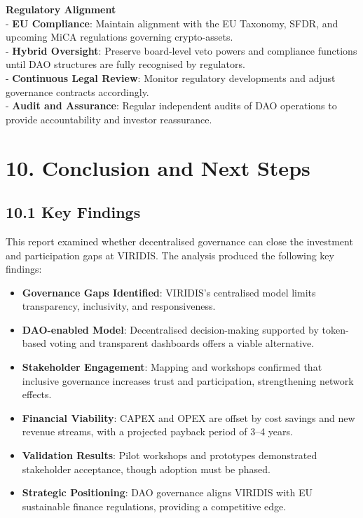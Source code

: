 \documentclass[
  english,
  12pt,
  oneside,
  open=any]{scrbook}
\providecommand{\tightlist}{%
  \setlength{\itemsep}{0pt}\setlength{\parskip}{0pt}}\usepackage{longtable,booktabs,array}
\begin{document}
\textbf{Regulatory Alignment}\\
- \textbf{EU Compliance}: Maintain alignment with the EU Taxonomy, SFDR,
and upcoming MiCA regulations governing crypto-assets.\\
- \textbf{Hybrid Oversight}: Preserve board-level veto powers and
compliance functions until DAO structures are fully recognised by
regulators.\\
- \textbf{Continuous Legal Review}: Monitor regulatory developments and
adjust governance contracts accordingly.\\
- \textbf{Audit and Assurance}: Regular independent audits of DAO
operations to provide accountability and investor reassurance.

\chapter{10. Conclusion and Next Steps}\label{sec-conclusion}

\section{10.1 Key Findings}\label{sec-findings}

This report examined whether decentralised governance can close the
investment and participation gaps at VIRIDIS. The analysis produced the
following key findings:

\begin{itemize}
\tightlist
\item
  \textbf{Governance Gaps Identified}: VIRIDIS's centralised model
  limits transparency, inclusivity, and responsiveness.\\
\item
  \textbf{DAO-enabled Model}: Decentralised decision-making supported by
  token-based voting and transparent dashboards offers a viable
  alternative.\\
\item
  \textbf{Stakeholder Engagement}: Mapping and workshops confirmed that
  inclusive governance increases trust and participation, strengthening
  network effects.\\
\item
  \textbf{Financial Viability}: CAPEX and OPEX are offset by cost
  savings and new revenue streams, with a projected payback period of
  3--4 years.\\
\item
  \textbf{Validation Results}: Pilot workshops and prototypes
  demonstrated stakeholder acceptance, though adoption must be phased.\\
\item
  \textbf{Strategic Positioning}: DAO governance aligns VIRIDIS with EU
  sustainable finance regulations, providing a competitive edge.
\end{itemize}
\end{document}
